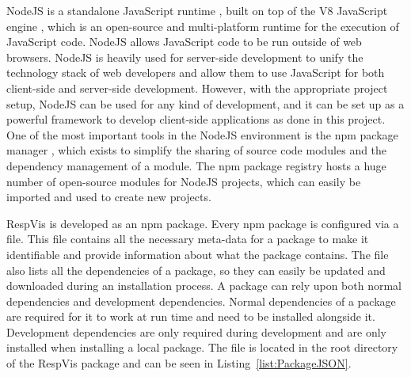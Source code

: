 NodeJS is a standalone JavaScript runtime \parencite{NodeJS}, built on
top of the V8 JavaScript engine \parencite{V8}, which is an
open-source and multi-platform runtime for the execution of JavaScript
code. NodeJS allows JavaScript code to be run outside of web
browsers. NodeJS is heavily used for server-side development to unify
the technology stack of web developers and allow them to use
JavaScript for both client-side and server-side development. However,
with the appropriate project setup, NodeJS can be used for any kind of
development, and it can be set up as a powerful framework to develop
client-side applications as done in this project. One of the most
important tools in the NodeJS environment is the npm package manager
\parencite{npm}, which exists to simplify the sharing of source code
modules and the dependency management of a module. The npm package
registry hosts a huge number of open-source modules for NodeJS
projects, which can easily be imported and used to create new
projects.

RespVis is developed as an npm package. Every npm package is
configured via a  file. This file contains all the
necessary meta-data for a package to make it identifiable and provide
information about what the package contains. The 
file also lists all the dependencies of a package, so they can easily
be updated and downloaded during an installation process. A package
can rely upon both normal dependencies and development
dependencies. Normal dependencies of a package are required for it to
work at run time and need to be installed alongside it. Development
dependencies are only required during development and are only
installed when installing a local package. The 
file is located in the root directory of the RespVis package and can
be seen in Listing~\ref{list:PackageJSON}.


\begin{samepage}
%
    The  file of the RespVis library.
    This file contains all the meta-data describing the package and its dependencies.
    Keywords and type dependencies have been omitted for readability.
  },
]{listings/package.json}
\end{samepage}





